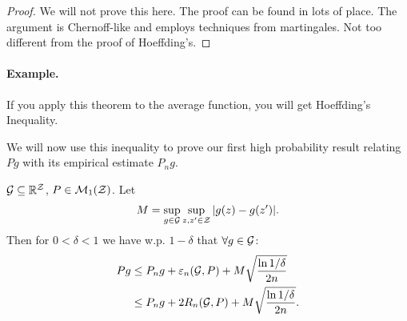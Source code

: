 \documentclass[twoside]{article}
\newcommand{\supg}{\sup_{g \in \cG}}
\begin{document}
\begin{proof}
We will not prove this here. The proof can be found in lots of place. The argument is Chernoff-like and employs techniques from martingales. Not too different from the proof of Hoeffding's.
\end{proof}

\paragraph{Example.}
If you apply this theorem to the average function, you will get Hoeffding's Inequality.

\vspace{1em}
\noindent We will now use this inequality to prove our first high probability result relating $Pg$ with its empirical estimate $P_n g$.


\begin{theorem} \label{thm:16_hp_rad}
    $\mathcal{G} \subseteq \mathbb{R}^{\mathcal{Z}}$, $P \in \mathcal{M}_1(\mathcal{Z})$. Let
    \begin{equation*}
        M = \supg \sup_{z, z' \in \cZ} | g(z) - g(z')|.
    \end{equation*}
    Then for $0 < \delta < 1$ we have w.p. $1-\delta$ that $\forall g \in \mathcal{G}$:
    \begin{align*}
        P g & \leq P_n g  + \varepsilon_n(\mathcal{G}, P) + M \sqrt{\frac{\ln 1 / \delta} {2n}}  \\
            & \leq P_n g  + 2 R_n(\mathcal{G}, P) + M \sqrt{\frac{\ln 1 / \delta} {2n}}.
    \end{align*}
\end{theorem}
\end{document}
